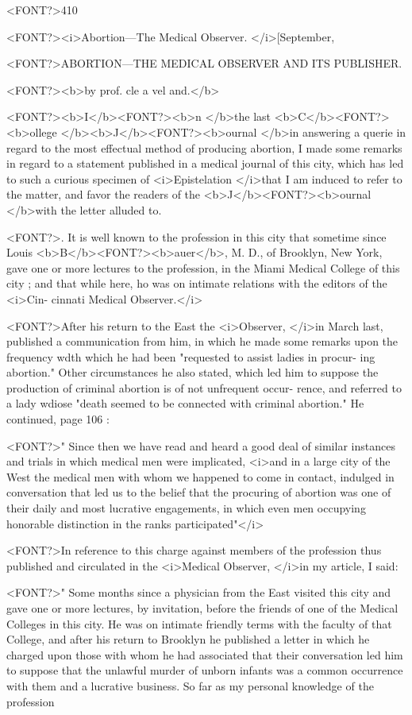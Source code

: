 <FONT?>410

<FONT?><i>Abortion---The Medical Observer. </i>[September,

<FONT?>ABORTION---THE  MEDICAL  OBSERVER AND
ITS PUBLISHER.

<FONT?><b>by prof. cle a vel and.</b>

<FONT?><b>I</b><FONT?><b>n </b>the last <b>C</b><FONT?><b>ollege </b><b>J</b><FONT?><b>ournal </b>in answering a querie in regard to the
most effectual method of producing abortion, I made some remarks in
regard to a statement published in a medical journal of this city, which
has led to such a curious specimen of <i>Epistelation </i>that I am induced
to refer to the matter, and favor the readers of the <b>J</b><FONT?><b>ournal </b>with the
letter alluded to.

<FONT?>. It is well known to the profession in this city that sometime since
Louis <b>B</b><FONT?><b>auer</b>, M. D., of Brooklyn, New York, gave one or more lectures
to the profession, in the Miami Medical College of this city ; and that
while here, ho was on intimate relations with the editors of the <i>Cin-
cinnati Medical Observer.</i>

<FONT?>After his return to the East the <i>Observer, </i>in March last, published a
communication from him, in which he made some remarks upon the
frequency wdth which he had been "requested to assist ladies in procur-
ing abortion." Other circumstances he also stated, which led him to
suppose the production of criminal abortion is of not unfrequent occur-
rence, and referred to a lady wdiose "death seemed to be connected with
criminal abortion."   He continued, page 106 :

<FONT?>" Since then we have read and heard a good deal of similar instances
and trials in which medical men were implicated, <i>and in a large city
of the West the medical men with whom we happened to come in
contact, indulged in conversation that led us to the belief that the
procuring of abortion was one of their daily and most lucrative
engagements, in which even men occupying honorable distinction in
the ranks participated"</i>

<FONT?>In reference to this charge against members of the profession thus
published and circulated in the <i>Medical Observer, </i>in my article, I
said:

<FONT?>" Some months since a physician from the East visited this city and
gave one or more lectures, by invitation, before the friends of one of
the Medical Colleges in this city. He was on intimate friendly terms
with the faculty of that College, and after his return to Brooklyn he
published a letter in which he charged upon those with whom he had
associated that their conversation led him to suppose that the unlawful
murder of unborn infants was a common occurrence with them and a
lucrative business.   So far as my personal knowledge of the profession\endinput
